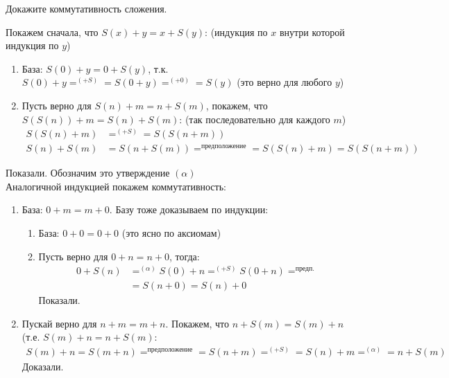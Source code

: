 \begin{task}[5]
Докажите коммутативность сложения.
\end{task}
\begin{solution}
Покажем сначала, что $S(x) + y = x + S(y)$: (индукция по $x$ внутри которой индукция по $y$)
\begin{enumerate}
	\item База: $S(0) + y = 0 + S(y)$, т.к. $S(0) + y =^{(+S)} = S(0 + y) =^{(+0)} = S(y)$ (это верно для любого $y$)
	\item Пусть верно для $S(n) + m = n + S(m)$, покажем, что $S(S(n)) + m = S(n) + S(m)$: (так последовательно для каждого $m$)
	\begin{align*}
		S(S(n) + m) &=^{(+S)} = S(S(n + m))\\
		S(n) + S(m) &= S(n + S(m)) =^{\text{предположение}} = S(S(n) + m) = S(S(n + m))
	\end{align*}
\end{enumerate}
Показали. Обозначим это утверждение $(\alpha)$\\
Аналогичной индукцией покажем коммутативность:
\begin{enumerate}
	\item База: $0 + m = m + 0$. Базу тоже доказываем по индукции:
		\begin{enumerate}
			\item База: $0 + 0 = 0 + 0$ (это ясно по аксиомам)
			\item Пусть верно для $0 + n = n + 0$, тогда: 
			\begin{align*}
				0 + S(n) &=^{(\alpha)} S(0) + n =^{(+S)} S(0 + n) =^{\text{предп.}} \\
				         &= S(n + 0) = S(n) + 0
			\end{align*} 
			Показали.
		\end{enumerate}
	\item Пускай верно для $n + m = m + n$. Покажем, что $n + S(m) = S(m) + n$ (т.е. $S(m) + n = n + S(m)$:
	\begin{align*}
		S(m) + n = S(m + n) =^{\text{предположение}} = S(n + m) =^{(+S)} = S(n) + m =^{(\alpha)} = n + S(m)
	\end{align*}
	Доказали.
\end{enumerate}
\xqed
\end{solution}



